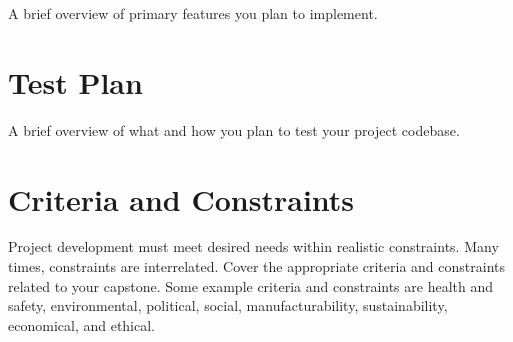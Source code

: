 A brief overview of primary features you plan to implement.




\section{Test Plan}

A brief overview of what and how you plan to test your project codebase.




\section{Criteria and Constraints}

Project development must meet desired needs within realistic constraints. Many times, constraints are interrelated. Cover the appropriate criteria and constraints related to your capstone. Some example criteria and constraints are health and safety, environmental, political, social, manufacturability, sustainability, economical, and ethical.

